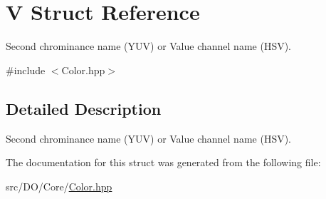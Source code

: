 \hypertarget{struct_d_o_1_1_v}{\section{V Struct Reference}
\label{struct_d_o_1_1_v}
}


Second chrominance name (Y\-U\-V) or Value channel name (H\-S\-V).  




{\ttfamily \#include $<$Color.\-hpp$>$}



\subsection{Detailed Description}
Second chrominance name (Y\-U\-V) or Value channel name (H\-S\-V). 

The documentation for this struct was generated from the following file\-:\begin{DoxyCompactItemize}
\item 
src/\-D\-O/\-Core/\hyperlink{_color_8hpp}{Color.\-hpp}\end{DoxyCompactItemize}

